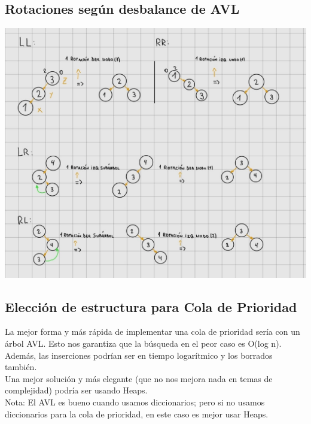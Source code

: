 \documentclass[10pt,a4paper]{article}
\begin{document}
\subsection*{Rotaciones según desbalance de AVL}
\label{subsec:rotaciones_avl}
\begin{center}
    \begin{minipage}[b]{0.9\textwidth}
        \includegraphics[width=\linewidth]{assets/rotaciones_avl_casos.jpg}
        \centering
        \label{fig:rotaciones_avl_casos}
    \end{minipage}
\end{center}
\subsection*{Elección de estructura para Cola de Prioridad}
\label{subsec:cola_de_prioridad_avl}
La mejor forma y más rápida de implementar una cola de prioridad sería con un árbol AVL. Esto nos garantiza que la búsqueda en el peor caso es O(log n). \\
Además, las inserciones podrían ser en tiempo logarítmico y los borrados también. \\
Una mejor solución y más elegante (que no nos mejora nada en temas de complejidad) podría ser usando Heaps. \\
Nota: El AVL es bueno cuando usamos diccionarios; pero si no usamos diccionarios para la cola de prioridad, en este caso es mejor usar Heaps.
\end{document}
